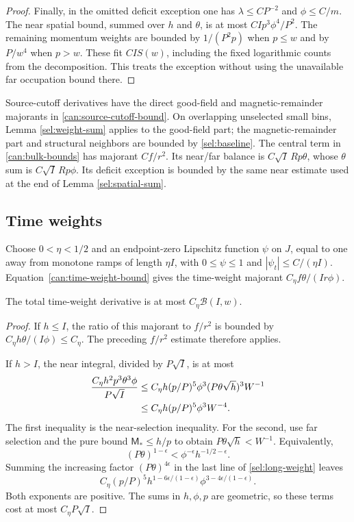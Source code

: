 \begin{proof}
Finally, in the omitted deficit exception one has
$\lambda\le CP^{-2}$ and $\phi\le C/m$. The near spatial bound, summed
over $h$ and $\theta$, is at most $CIp^3\phi^4/P^2$. The remaining
momentum weights are bounded by $1/(P^2p)$ when $p\le w$ and by
$P/w^4$ when $p>w$. These fit $CI S(w)$, including the fixed logarithmic
counts from the decomposition. This treats the exception without using
the unavailable far occupation bound there.
\end{proof}

Source-cutoff derivatives have the direct good-field and magnetic-remainder
majorants in \eqref{can:source-cutoff-bound}. On overlapping unselected small bins, Lemma
\ref{sel:weight-sum} applies to the good-field part; the magnetic-remainder part
and structural neighbors are bounded by \eqref{sel:baseline}. The
central term in \eqref{can:bulk-bounds} has majorant $Cf/r^2$. Its
near/far balance is $C\sqrt I\,Rp\theta$, whose $\theta$ sum is
$C\sqrt I\,Rp\phi$. Its deficit exception is bounded by the same near
estimate used at the end of Lemma \ref{sel:spatial-sum}.

\subsection{Time weights}

Choose $0<\eta<1/2$ and an endpoint-zero Lipschitz function $\psi$ on
$J$, equal to one away from monotone ramps of length $\eta I$, with
$0\le\psi\le1$ and $|\psi_t|\le C/(\eta I)$. Equation~\eqref{can:time-weight-bound}
gives the time-weight majorant $C_\eta f\theta/(Ir\phi)$.

\begin{lemma}\label{sel:time-weight}
The total time-weight derivative is at most $C_\eta\mathcal B(I,w)$.
\end{lemma}

\begin{proof}
If $h\le I$, the ratio of this majorant to $f/r^2$ is bounded by
$C_\eta h\theta/(I\phi)\le C_\eta$. The preceding $f/r^2$ estimate
therefore applies.

If $h>I$, the near integral, divided by $P\sqrt I$, is at most
\begin{align}\label{sel:long-weight}
 \frac{C_\eta h^2p^3\theta^3\phi}{P\sqrt I}
 &\le C_\eta h(p/P)^5\phi^3(P\theta\sqrt h)^3W^{-1}\notag\\
 &\le C_\eta h(p/P)^5\phi^3W^{-4}.
\end{align}
The first inequality is the near-selection inequality. For the second,
use far selection and the pure bound $\mathsf M_*\le h/p$ to obtain
$P\theta\sqrt h<W^{-1}$. Equivalently,
\[
 (P\theta)^{1-\epsilon}
 <\phi^{-\epsilon}h^{-1/2-\epsilon}.
\]
Summing the increasing factor $(P\theta)^{4\epsilon}$ in the last
line of \eqref{sel:long-weight} leaves
\[
 C_\eta(p/P)^5
 h^{1-6\epsilon/(1-\epsilon)}
 \phi^{3-4\epsilon/(1-\epsilon)}.
\]
Both exponents are positive. The sums in $h,\phi,p$ are geometric, so
these terms cost at most $C_\eta P\sqrt I$.
\end{proof}

